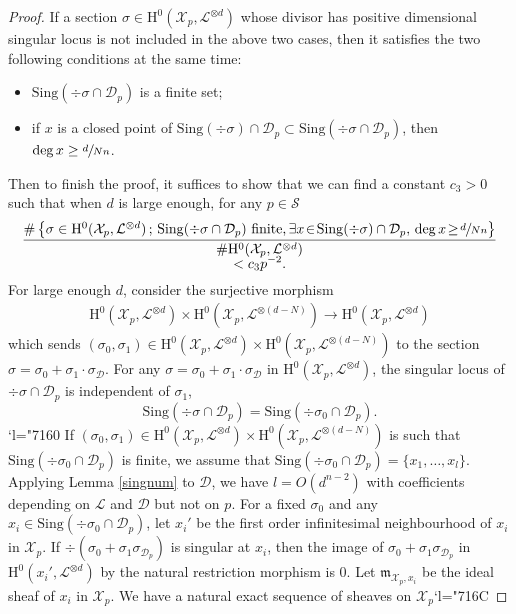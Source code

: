 \documentclass[JEP,XML,SOM,Unicode,published]{cedram}
\newcommand{\Changel}{\mathcode`l="7160}
\newcommand{\Changelback}{\mathcode`l="716C}
\newcommand{\sep}{\,;\,}
\theoremstyle{plain}
\theoremstyle{definition}
\newcommand{\ho}{\mathrm{H}}
\newcommand{\X}{\mathcal{X}}
\newcommand{\li}{\mathcal{L}}
\begin{document}
\begin{proof}
If a section $ \sigma\in \ho^0(\X_p, \li^{\otimes d})$ whose divisor has positive dimensional singular locus is not included in the above two cases, then it satisfies the two following conditions at the same time:
\begin{itemize}
\item $\mathrm{Sing}(\div \sigma\cap \mathcal{D}_p)$ is a finite set;
\item if $x$ is a closed point of $\mathrm{Sing}(\div \sigma)\cap \mathcal{D}_p\subset \mathrm{Sing}(\div \sigma\cap \mathcal{D}_p)$, then $\deg x\geq \sfrac{d}{Nn} $.
\end{itemize}
Then to finish the proof, it suffices to show that we can find a constant $c_3>0$ such that when $d$ is large enough, for any $p\in \mathcal{S}$
\begin{multline*}
\frac{\#\left\{ \sigma\in \ho^0(\X_p, \li^{\otimes d})\sep \mathrm{Sing}(\div \sigma\cap \mathcal{D}_p) \text{ finite,}\, \exists x\!\in\!\mathrm{Sing}(\div \sigma)\cap \mathcal{D}_p,\, \deg x\!\geq\! \sfrac{d}{Nn} \right\}}{\#\ho^0(\X_p, \li^{\otimes d})}\\[-5pt]
< c_3p^{-2}.
\end{multline*}
For large enough $d$, consider the surjective morphism
\begin{align*}
\ho^0(\X_p, \li^{\otimes d})\times \ho^0(\X_p, \li^{\otimes (d-N)}) \to \ho^0(\X_p, \li^{\otimes d})
\end{align*}
which sends $(\sigma_0, \sigma_1)\!\in\!\ho^0(\X_p, \li^{\otimes d})\times \ho^0(\X_p, \li^{\otimes (d-N)})$ to the section \hbox{$\sigma\!=\!\sigma_0\!+\!\sigma_1{\cdot} \sigma_{\mathcal{D}}$}. For any $\sigma=\sigma_0+\sigma_1\cdot \sigma_{\mathcal{D}}$ in $\ho^0(\X_p, \li^{\otimes d})$, the singular locus of $\div \sigma\cap \mathcal{D}_p$ is independent of $\sigma_1$, \ie
\[
\mathrm{Sing}(\div \sigma\cap \mathcal{D}_p)=\mathrm{Sing}(\div \sigma_0\cap \mathcal{D}_p).
\]
\Changel%
If $(\sigma_0, \sigma_1)\in \ho^0(\X_p, \li^{\otimes d})\times \ho^0(\X_p, \li^{\otimes (d-N)})$ is such that $\mathrm{Sing}(\div \sigma_0\cap \mathcal{D}_p)$ is finite, we assume that $\mathrm{Sing}(\div \sigma_0\cap \mathcal{D}_p)=\{ x_1,\dots ,x_l \}$. Applying Lemma \ref{singnum} to $\mathcal{D}$, we have $l=O(d^{n-2})$ with coefficients depending on $\li$ and $\mathcal{D}$ but not on $p$. For a fixed $\sigma_0$ and any $x_i\in \mathrm{Sing}(\div \sigma_0\cap \mathcal{D}_p)$, let $x_i'$ be the first order infinitesimal neighbourhood of $x_i$ in $\X_p$. If $\div \left(\sigma_0+\sigma_1\sigma_{\mathcal{D}_p}\right)$ is singular at $x_i$, then the image of $\sigma_0+\sigma_1\sigma_{\mathcal{D}_p}$ in $\ho^0(x_i', \li^{\otimes d})$ by the natural restriction morphism is $0$. Let $\mathfrak{m}_{\X_p, x_i}$ be the ideal sheaf of $x_i$ in $\X_p$. We have a natural exact sequence of sheaves on $\X_p$\Changelback%

\end{proof}
\end{document}
